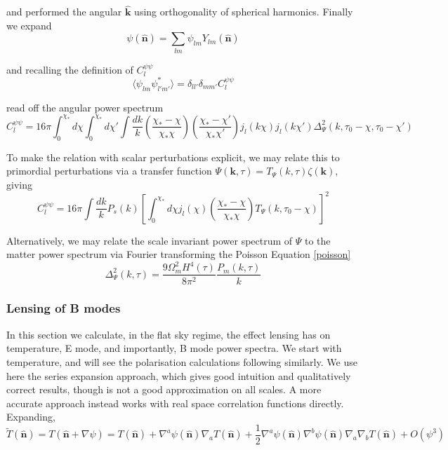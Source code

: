 \documentclass[a4paper,10pt]{article}
\renewcommand{\v}[1]{\mathbf{#1}}
\newcommand{\half}{\frac{1}{2}}
\newcommand{\unit}[1]{\hat{\v{#1}}}
\begin{document}
and performed the angular $\unit{k}$ using orthogonality of spherical harmonics. Finally we expand
\begin{equation}
\psi(\unit{n}) = \sum_{lm}\psi_{lm}Y_{lm}(\unit{n})
\end{equation}

and recalling the definition of $C_l^{\psi\psi}$
\begin{equation}
\langle \psi_{lm}\psi_{l'm'}^* \rangle = \delta_{ll'}\delta_{mm'}C_l^{\psi\psi}
\end{equation}

read off the angular power spectrum
\begin{equation}
C_l^{\psi\psi} = 16\pi \int_0^{\chi_*} d\chi \int_0^{\chi_*} d\chi' \int \frac{dk}{k} (\frac{\chi_*-\chi}{\chi_*\chi})(\frac{\chi_*-\chi'}{\chi_*\chi'})j_l(k\chi)j_l(k\chi')\Delta^2_\Psi(k, \tau_0-\chi, \tau_0-\chi')
\end{equation}

To make the relation with scalar perturbations explicit, we may relate this to primordial perturbations via a transfer function $\Psi(\v{k},\tau)=T_\Psi(k,\tau)\zeta(\v{k})$, giving
\begin{equation}
C_l^{\psi\psi} = 16\pi \int \frac{dk}{k} P_s(k) \left[\int_0^{\chi_*} d\chi j_l(\chi) (\frac{\chi_*-\chi}{\chi_*\chi})T_\Psi(k, \tau_0-\chi)\right]^2
\end{equation}

Alternatively, we may relate the scale invariant power spectrum of $\Psi$ to the matter power spectrum via Fourier transforming the Poisson Equation \ref{poisson}\\
\begin{equation}
\Delta^2_\Psi(k,\tau) = \frac{9\Omega^2_mH^4(\tau)}{8\pi^2}\frac{P_m(k,\tau)}{k}
\end{equation}

\subsubsection{Lensing of B modes} 

In this section we calculate, in the flat sky regime, the effect lensing has on temperature, E mode, and importantly, B mode power spectra. We start with temperature, and will see the polarisation calculations following similarly. We use here the series expansion approach, which gives good intuition and qualitatively correct results, though is not a good approximation on all scales. A more accurate approach instead works with real space correlation functions directly. Expanding,
\begin{equation}
\tilde{T}(\unit{n}) = T(\unit{n}+\nabla\psi) =T(\unit{n})+\nabla^a\psi(\unit{n})\nabla_aT(\unit{n})+\half\nabla^a\psi(\unit{n})\nabla^b\psi(\unit{n})\nabla_a\nabla_bT(\unit{n})+O(\psi^3)
\end{equation}
\end{document}

